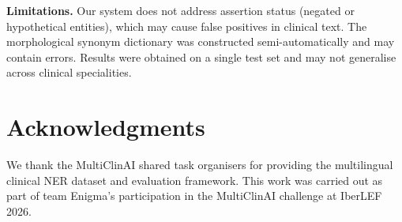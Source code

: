 \documentclass[11pt]{article}
\begin{document}
\textbf{Limitations.} Our system does not address assertion status (negated or hypothetical
entities), which may cause false positives in clinical text. The morphological synonym
dictionary was constructed semi-automatically and may contain errors. Results were
obtained on a single test set and may not generalise across clinical specialities.

\section*{Acknowledgments}
We thank the MultiClinAI shared task organisers for providing the multilingual clinical
NER dataset and evaluation framework. This work was carried out as part of
team Enigma's participation in the MultiClinAI challenge at IberLEF 2026.


\end{document}
